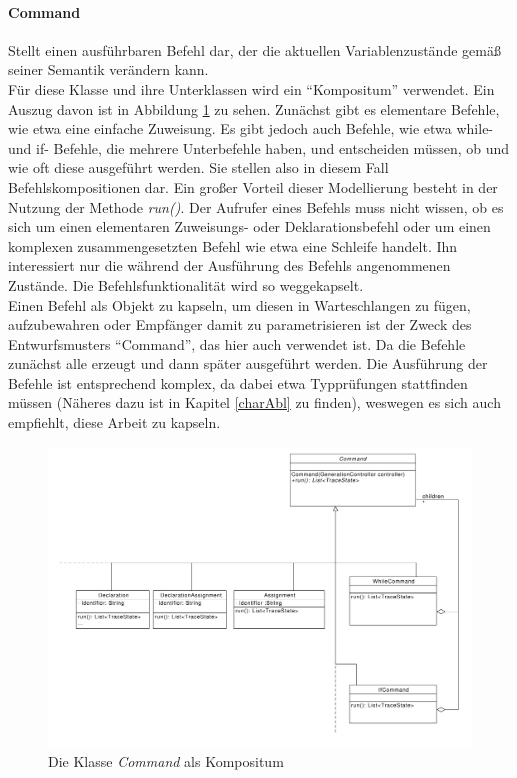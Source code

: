 \documentclass[parskip=full]{scrartcl}
\begin{document}
\paragraph{Command}
Stellt einen ausführbaren Befehl dar, der die aktuellen Variablenzustände gemäß seiner Semantik verändern kann.
\\
Für diese Klasse und ihre Unterklassen wird ein \enquote{Kompositum} verwendet.
Ein Auszug davon ist in Abbildung \ref{Command} zu sehen. Zunächst gibt es elementare Befehle, wie etwa eine einfache Zuweisung. Es gibt jedoch auch Befehle, wie etwa while- und if- Befehle, die mehrere Unterbefehle haben, und entscheiden müssen, ob und wie oft diese ausgeführt werden. Sie stellen also in diesem Fall Befehlskompositionen dar. Ein großer Vorteil dieser Modellierung besteht in der Nutzung der Methode \textit{run()}. Der Aufrufer eines Befehls muss nicht wissen, ob es sich um einen elementaren Zuweisungs- oder Deklarationsbefehl oder um einen komplexen zusammengesetzten Befehl wie etwa eine Schleife handelt. Ihn interessiert nur die während der Ausführung des Befehls angenommenen Zustände. Die Befehlsfunktionalität wird so weggekapselt. \\
Einen Befehl als Objekt zu kapseln, um diesen in Warteschlangen zu fügen, aufzubewahren oder Empfänger damit zu parametrisieren ist der Zweck des Entwurfsmusters \enquote{Command}, das hier auch verwendet ist. Da die Befehle zunächst alle erzeugt und dann später ausgeführt werden. Die Ausführung der Befehle ist entsprechend komplex, da dabei etwa Typprüfungen stattfinden müssen (Näheres dazu ist in Kapitel \ref{charAbl} zu finden), weswegen es sich auch empfiehlt, diese Arbeit zu kapseln. 
\begin{figure}[!h]
\centering
\includegraphics[width=1.0\textwidth]{diagrammIdeenUmlet/CommandComposite.pdf}
\caption{Die Klasse \textit{Command} als Kompositum}
\label{Command}
\end{figure}
\end{document}
